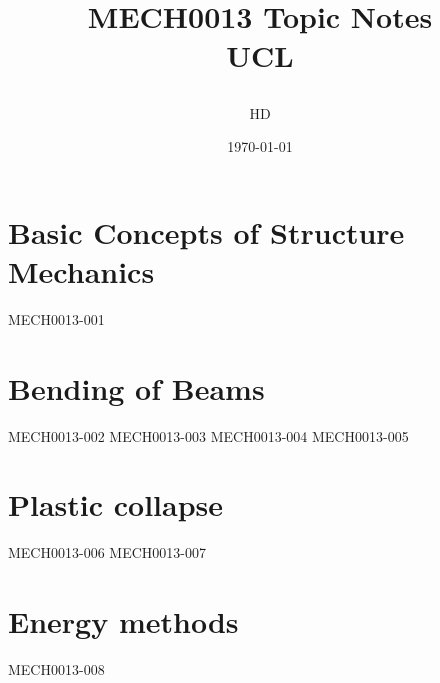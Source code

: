 \documentclass[12pt,a4paper, twoside]{report}
\begin{document}
\title{
  {MECH0013 Topic Notes}\\
  {\large UCL}
  \author{HD}
  \date{\today}
}
\maketitle
\tableofcontents
\chapter{Basic Concepts of Structure Mechanics}
{MECH0013-001}
\chapter{Bending of Beams}
{MECH0013-002}
{MECH0013-003}
{MECH0013-004}
{MECH0013-005}
\chapter{Plastic collapse}
{MECH0013-006}
{MECH0013-007}
\chapter{Energy methods}
{MECH0013-008}
\end{document}

